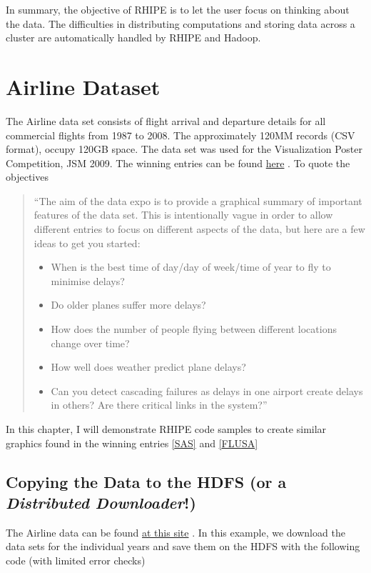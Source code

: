 \documentclass[letterpaper,10pt,english]{sphinxmanual}
\begin{document}
In summary, the objective of RHIPE is to let the user focus on thinking about
the data. The difficulties in distributing computations and storing data across
a cluster are automatically handled by RHIPE and Hadoop.


\chapter{Airline Dataset}
\label{airline:airline-dataset}\label{airline::doc}
The Airline data set consists of flight arrival and departure details for all
commercial flights from 1987 to 2008. The approximately 120MM records (CSV format),  occupy
120GB space. The data set was used for the Visualization Poster Competition, JSM
2009. The winning entries can be found \href{http://stat-computing.org/dataexpo/2009/}{here} .
To quote the objectives
\begin{quote}

``The aim of the data expo is to provide a graphical summary of important
features of the data set. This is intentionally vague in order to allow
different entries to focus on different aspects of the data, but here are a
few ideas to get you started:
\begin{itemize}
\item {} 
When is the best time of day/day of week/time of year to fly to minimise delays?

\item {} 
Do older planes suffer more delays?

\item {} 
How does the number of people flying between different locations change over time?

\item {} 
How well does weather predict plane delays?

\item {} 
Can you detect cascading failures as delays in one airport create delays in
others? Are there critical links in the system?''

\end{itemize}
\end{quote}

In this chapter, I will demonstrate RHIPE code samples to create similar
graphics found in the winning entries \hyperref[airline:sas]{{[}SAS{]}} and \hyperref[airline:flusa]{{[}FLUSA{]}}


\section{Copying the Data to the HDFS (or a \emph{Distributed Downloader}!)}
\label{airline:copying-the-data-to-the-hdfs-or-a-distributed-downloader}\label{airline:downloading-airline-data}
The Airline data can be found \href{http://stat-computing.org/dataexpo/2009/the-data.html}{at this site} .
In this example, we download the data sets for the individual years and save
them on the HDFS with the following code (with limited error checks)
\end{document}
